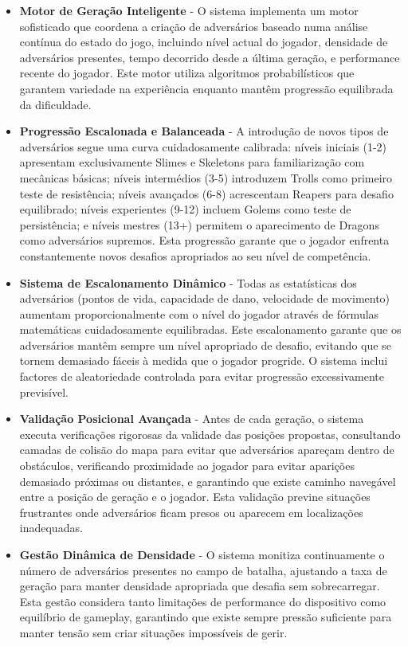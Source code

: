 \begin{itemize}
  \item \textbf{Motor de Geração Inteligente} - O sistema implementa um motor sofisticado que coordena a criação de adversários baseado numa análise contínua do estado do jogo, incluindo nível actual do jogador, densidade de adversários presentes, tempo decorrido desde a última geração, e performance recente do jogador. Este motor utiliza algoritmos probabilísticos que garantem variedade na experiência enquanto mantêm progressão equilibrada da dificuldade.
  
  \item \textbf{Progressão Escalonada e Balanceada} - A introdução de novos tipos de adversários segue uma curva cuidadosamente calibrada: níveis iniciais (1-2) apresentam exclusivamente Slimes e Skeletons para familiarização com mecânicas básicas; níveis intermédios (3-5) introduzem Trolls como primeiro teste de resistência; níveis avançados (6-8) acrescentam Reapers para desafio equilibrado; níveis experientes (9-12) incluem Golems como teste de persistência; e níveis mestres (13+) permitem o aparecimento de Dragons como adversários supremos. Esta progressão garante que o jogador enfrenta constantemente novos desafios apropriados ao seu nível de competência.
  
  \item \textbf{Sistema de Escalonamento Dinâmico} - Todas as estatísticas dos adversários (pontos de vida, capacidade de dano, velocidade de movimento) aumentam proporcionalmente com o nível do jogador através de fórmulas matemáticas cuidadosamente equilibradas. Este escalonamento garante que os adversários mantêm sempre um nível apropriado de desafio, evitando que se tornem demasiado fáceis à medida que o jogador progride. O sistema inclui factores de aleatoriedade controlada para evitar progressão excessivamente previsível.
  
  \item \textbf{Validação Posicional Avançada} - Antes de cada geração, o sistema executa verificações rigorosas da validade das posições propostas, consultando camadas de colisão do mapa para evitar que adversários apareçam dentro de obstáculos, verificando proximidade ao jogador para evitar aparições demasiado próximas ou distantes, e garantindo que existe caminho navegável entre a posição de geração e o jogador. Esta validação previne situações frustrantes onde adversários ficam presos ou aparecem em localizações inadequadas.
  
  \item \textbf{Gestão Dinâmica de Densidade} - O sistema monitiza continuamente o número de adversários presentes no campo de batalha, ajustando a taxa de geração para manter densidade apropriada que desafia sem sobrecarregar. Esta gestão considera tanto limitações de performance do dispositivo como equilíbrio de gameplay, garantindo que existe sempre pressão suficiente para manter tensão sem criar situações impossíveis de gerir.
  

\end{itemize}

